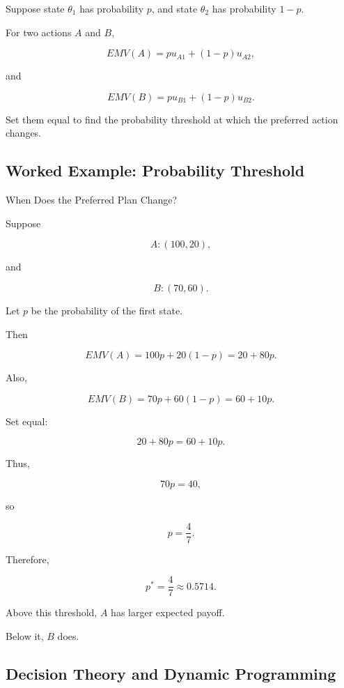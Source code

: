 Suppose state \(\theta_1\) has probability \(p\), and state \(\theta_2\)
has probability \(1-p\).

For two actions \(A\) and \(B\),

\[
EMV(A)
=
pu_{A1}
+
(1-p)u_{A2},
\]

and

\[
EMV(B)
=
pu_{B1}
+
(1-p)u_{B2}.
\]

Set them equal to find the probability threshold at which the preferred
action changes.

\subsection{Worked Example: Probability Threshold}
\label{subsec:worked-probability-threshold}

\begin{workedexamplebox}{When Does the Preferred Plan Change?}

Suppose

\[
A:
(100,20),
\]

and

\[
B:
(70,60).
\]

Let \(p\) be the probability of the first state.

Then

\[
EMV(A)
=
100p
+
20(1-p)
=
20+80p.
\]

Also,

\[
EMV(B)
=
70p
+
60(1-p)
=
60+10p.
\]

Set equal:

\[
20+80p
=
60+10p.
\]

Thus,

\[
70p
=
40,
\]

so

\[
p
=
\frac47.
\]

Therefore,

\begin{answerbox}
\[
\boxed{
p^*
=
\frac47
\approx0.5714.
}
\]
\end{answerbox}

Above this threshold, \(A\) has larger expected payoff.

Below it, \(B\) does.

\end{workedexamplebox}

\subsection{Decision Theory and Dynamic Programming}
\label{subsec:decision-theory-dynamic-programming}

